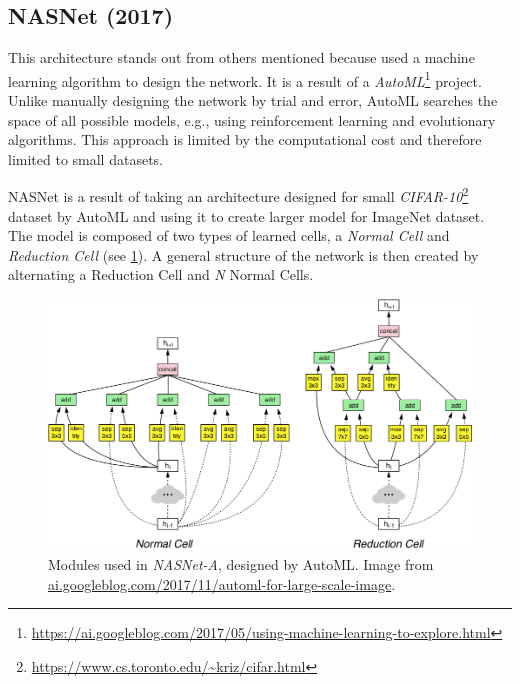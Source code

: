 \subsection{NASNet (2017)}
\label{sec:nasnet}
This architecture stands out from others mentioned because \citeauthor{bib:nasnet} \cite{bib:nasnet} used a machine learning algorithm to design the network. It is a result of a \textit{AutoML}\footnote{\url{https://ai.googleblog.com/2017/05/using-machine-learning-to-explore.html}} project. Unlike manually designing the network by trial and error, AutoML searches the space of all possible models, e.g., using reinforcement learning and evolutionary algorithms. This approach is limited by the computational cost and therefore limited to small datasets.

NASNet is a result of taking an architecture designed for small \textit{CIFAR-10}\footnote{\url{https://www.cs.toronto.edu/~kriz/cifar.html}} dataset by AutoML and using it to create larger model for ImageNet dataset. The model is composed of two types of learned cells, a \textit{Normal Cell} and \textit{Reduction Cell} (see \cref{fig:nasnet}). A general structure of the network is then created by alternating a Reduction Cell and \textit{N} Normal Cells.

\begin{figure}
    \includegraphics[width=\textwidth]{img/nasnet}
    \caption[NASNet-A modules]
    {Modules used in \textit{NASNet-A}, designed by AutoML. Image from \url{ai.googleblog.com/2017/11/automl-for-large-scale-image}.}
    \label{fig:nasnet}
\end{figure}


